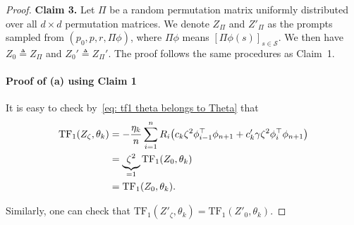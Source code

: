 \documentclass{article}
\newcommand{\fS}{\mathcal{S}}
\newcommand{\tf}{\text{TF}}
\begin{document}
\begin{proof}
\textbf{Claim 3.}
Let $\Pi$ be a random permutation matrix uniformly distributed over all $d\times d$ permutation matrices.
We denote $Z_\Pi$ and $Z'_\Pi$ as the prompts sampled from $(p_0, p, r, \Pi\phi)$, where $\Pi\phi$ means $[\Pi\phi(s)]_{s\in\fS}$.
We then have $Z_0 \triangleq Z_\Pi$ and $Z_0' \triangleq Z_\Pi'$.
The proof follows the same procedures as Claim~1.
\paragraph{Proof of (a) using Claim 1}

It is easy to check by~\eqref{eq: tf1 theta belongs to Theta} that 
\begin{align}
    \tf_1(Z_\zeta,\theta_k) 
    &= -\frac{\eta_k}{n}\sum_{i=1}^n  R_i \qty( c_k \zeta^2 \phi_{i-1}^\top \phi_{n+1} + c'_k \gamma \zeta^2 \phi_{i}^\top \phi_{n+1})\\ 
    &= \underbrace{\zeta^2}_{=1} \tf_1(Z_0,\theta_k)\\ 
    &= \tf_1(Z_0,\theta_k). \label{eq: (a) proof TF equivalence zeta}
\end{align}

Similarly, one can check that $\tf_1(Z'_\zeta, \theta_k) = \tf_1(Z'_0, \theta_k)$.


\end{proof}
\end{document}
